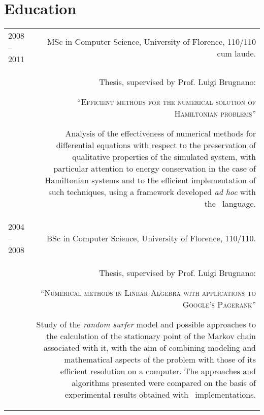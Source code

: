 \documentclass[10pt]{article}
\begin{document}
\section*{Education}
\begin{longtable}{L!{\VRule}R}
2008 -- 2011 & MSc in Computer Science, University of Florence, 110/110 cum laude.\\[5pt]
    & Thesis, supervised by Prof. Luigi Brugnano:
	\begin{center}``\textsc{Efficient methods for the numerical solution of Hamiltonian problems}''\end{center}
	Analysis of the effectiveness of numerical methods for differential equations with respect to the preservation
	of qualitative properties of the simulated system, with particular attention to energy conservation in the case
	of Hamiltonian systems and to the efficient implementation of such techniques, using a framework developed \emph{ad hoc}
	with the \clang\ language.\\[5pt]
2004 -- 2008 & BSc in Computer Science, University of Florence, 110/110.\\[5pt]
    & Thesis, supervised by Prof. Luigi Brugnano:
    \begin{center}``\textsc{Numerical methods in Linear Algebra with applications to Google's Pagerank}''\end{center}
	Study of the \emph{random surfer} model and possible approaches to the calculation of the stationary point of the Markov
	chain associated with it, with the aim of combining modeling and mathematical aspects of the problem with those of its efficient
	resolution on a computer. The approaches and algorithms presented were compared on the basis of experimental results obtained
	with \matlab\ implementations.
\end{longtable}
\end{document}
